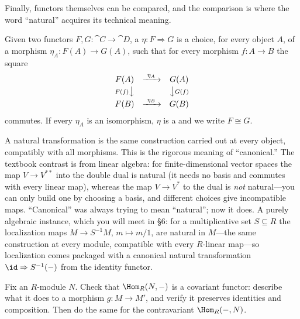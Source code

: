 \documentclass[11pt]{article}
\begin{document}
Finally, functors themselves can be compared, and the comparison is where the word
``natural'' acquires its technical meaning.

\begin{ddefinition}
Given two functors $F,G\colon\cat{C}\to\cat{D}$, a 
$\eta\colon F\Rightarrow G$ is a choice, for every object $A$, of a morphism
$\eta_A\colon F(A)\to G(A)$, such that for every morphism $f\colon A\to B$ the square
\[
\begin{array}{ccc}
F(A) & \xrightarrow{\ \eta_A\ } & G(A)\\[2pt]
{\scriptstyle F(f)}\big\downarrow & & \big\downarrow{\scriptstyle G(f)}\\[2pt]
F(B) & \xrightarrow{\ \eta_B\ } & G(B)
\end{array}
\]
commutes. If every $\eta_A$ is an isomorphism, $\eta$ is a  and we
write $F\cong G$.
\end{ddefinition}

\begin{iintuition}
A natural transformation is the same construction carried out at every object, compatibly
with all morphisms. This is the rigorous meaning of ``canonical.'' The textbook contrast is
from linear algebra: for finite-dimensional vector spaces the map $V\to V^{**}$ into the
double dual is natural (it needs no basis and commutes with every linear map), whereas the
map $V\to V^{*}$ to the dual is \emph{not} natural---you can only build one by choosing a
basis, and different choices give incompatible maps. ``Canonical'' was always trying to mean
``natural''; now it does. A purely algebraic instance, which you will meet in \S6: for a
multiplicative set $S\subseteq R$ the localization maps $M\to S^{-1}M$, $m\mapsto m/1$, are
natural in $M$---the same construction at every module, compatible with every $R$-linear
map---so localization comes packaged with a canonical natural transformation
$\id\Rightarrow S^{-1}(-)$ from the identity functor.
\end{iintuition}

\begin{xca}
Fix an $R$-module $N$. Check that $\Hom_R(N,-)$ is a covariant functor: describe what it does
to a morphism $g\colon M\to M'$, and verify it preserves identities and composition. Then do
the same for the contravariant $\Hom_R(-,N)$.
\end{xca}
\end{document}
